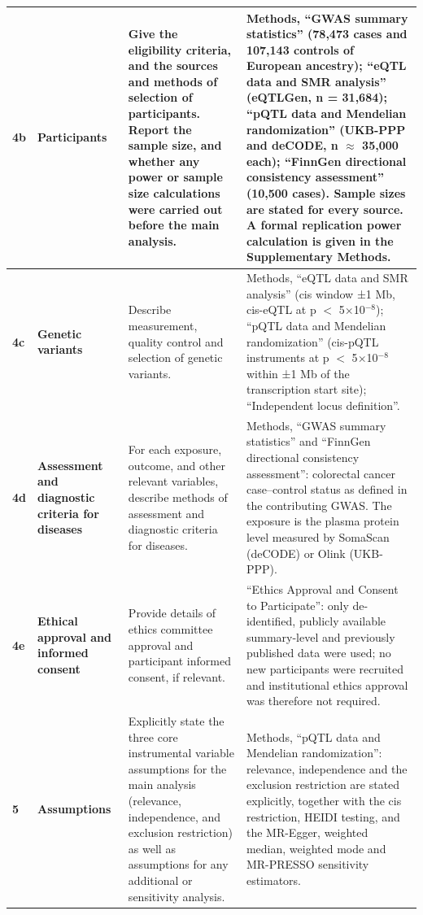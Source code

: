 \documentclass[10pt,a4paper]{article}
\begin{document}
\begin{longtable}{@{}p{7mm}p{32mm}p{52mm}p{68mm}@{}}
\midrule
\textbf{4b} & \textbf{Participants} & Give the eligibility criteria, and the sources and methods of selection of participants. Report the sample size, and whether any power or sample size calculations were carried out before the main analysis. & Methods, ``GWAS summary statistics'' (78,473 cases and 107,143 controls of European ancestry); ``eQTL data and SMR analysis'' (eQTLGen, n = 31,684); ``pQTL data and Mendelian randomization'' (UKB-PPP and deCODE, n $\approx$ 35,000 each); ``FinnGen directional consistency assessment'' (10,500 cases). Sample sizes are stated for every source. A formal replication power calculation is given in the Supplementary Methods. \\
\midrule
\textbf{4c} & \textbf{Genetic variants} & Describe measurement, quality control and selection of genetic variants. & Methods, ``eQTL data and SMR analysis'' (cis window ±1 Mb, cis-eQTL at p $<$ 5$\times$10$^{-8}$); ``pQTL data and Mendelian randomization'' (cis-pQTL instruments at p $<$ 5$\times$10$^{-8}$ within ±1 Mb of the transcription start site); ``Independent locus definition''. \\
\midrule
\textbf{4d} & \textbf{Assessment and diagnostic criteria for diseases} & For each exposure, outcome, and other relevant variables, describe methods of assessment and diagnostic criteria for diseases. & Methods, ``GWAS summary statistics'' and ``FinnGen directional consistency assessment'': colorectal cancer case--control status as defined in the contributing GWAS. The exposure is the plasma protein level measured by SomaScan (deCODE) or Olink (UKB-PPP). \\
\midrule
\textbf{4e} & \textbf{Ethical approval and informed consent} & Provide details of ethics committee approval and participant informed consent, if relevant. & ``Ethics Approval and Consent to Participate'': only de-identified, publicly available summary-level and previously published data were used; no new participants were recruited and institutional ethics approval was therefore not required. \\
\midrule
\textbf{5} & \textbf{Assumptions} & Explicitly state the three core instrumental variable assumptions for the main analysis (relevance, independence, and exclusion restriction) as well as assumptions for any additional or sensitivity analysis. & Methods, ``pQTL data and Mendelian randomization'': relevance, independence and the exclusion restriction are stated explicitly, together with the cis restriction, HEIDI testing, and the MR-Egger, weighted median, weighted mode and MR-PRESSO sensitivity estimators. \\

\end{longtable}
\end{document}
